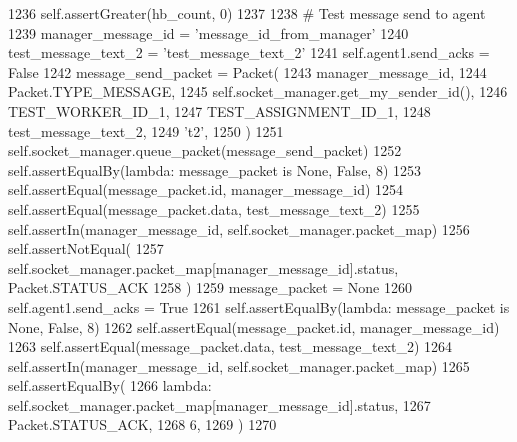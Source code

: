 \begin{DoxyCode}
1236         self.assertGreater(hb\_count, 0)
1237 
1238         \textcolor{comment}{# Test message send to agent}
1239         manager\_message\_id = \textcolor{stringliteral}{'message\_id\_from\_manager'}
1240         test\_message\_text\_2 = \textcolor{stringliteral}{'test\_message\_text\_2'}
1241         self.agent1.send\_acks = \textcolor{keyword}{False}
1242         message\_send\_packet = Packet(
1243             manager\_message\_id,
1244             Packet.TYPE\_MESSAGE,
1245             self.socket\_manager.get\_my\_sender\_id(),
1246             TEST\_WORKER\_ID\_1,
1247             TEST\_ASSIGNMENT\_ID\_1,
1248             test\_message\_text\_2,
1249             \textcolor{stringliteral}{'t2'},
1250         )
1251         self.socket\_manager.queue\_packet(message\_send\_packet)
1252         self.assertEqualBy(\textcolor{keyword}{lambda}: message\_packet \textcolor{keywordflow}{is} \textcolor{keywordtype}{None}, \textcolor{keyword}{False}, 8)
1253         self.assertEqual(message\_packet.id, manager\_message\_id)
1254         self.assertEqual(message\_packet.data, test\_message\_text\_2)
1255         self.assertIn(manager\_message\_id, self.socket\_manager.packet\_map)
1256         self.assertNotEqual(
1257             self.socket\_manager.packet\_map[manager\_message\_id].status, Packet.STATUS\_ACK
1258         )
1259         message\_packet = \textcolor{keywordtype}{None}
1260         self.agent1.send\_acks = \textcolor{keyword}{True}
1261         self.assertEqualBy(\textcolor{keyword}{lambda}: message\_packet \textcolor{keywordflow}{is} \textcolor{keywordtype}{None}, \textcolor{keyword}{False}, 8)
1262         self.assertEqual(message\_packet.id, manager\_message\_id)
1263         self.assertEqual(message\_packet.data, test\_message\_text\_2)
1264         self.assertIn(manager\_message\_id, self.socket\_manager.packet\_map)
1265         self.assertEqualBy(
1266             \textcolor{keyword}{lambda}: self.socket\_manager.packet\_map[manager\_message\_id].status,
1267             Packet.STATUS\_ACK,
1268             6,
1269         )
1270 
\end{DoxyCode}
\mbox{\label{classparlai_1_1mturk_1_1core_1_1test_1_1test__socket__manager_1_1TestSocketManagerMessageHandling_a8cf0c53c1d5a85e2305decbec92b323b}} 
